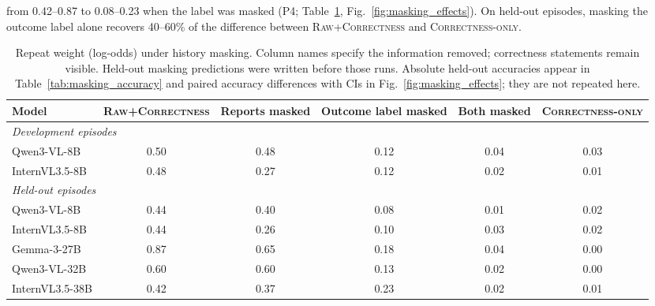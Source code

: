 \documentclass[letterpaper]{article} %
\newcommand{\RawCorrectness}{\textsc{Raw+Correctness}}
\newcommand{\CorrectnessOnly}{\textsc{Correctness-only}}
\begin{document}
from 0.42--0.87 to 0.08--0.23 when the label was masked (P4; Table~\ref{tab:mask}, Fig.~\ref{fig:masking_effects}). On held-out episodes, masking the outcome label alone recovers 40--60\% of the difference between \RawCorrectness{} and \CorrectnessOnly{}.

\begin{table}[!t]\centering\small
  \setlength{\tabcolsep}{5pt}
  \begin{tabular}{l ccccc}
    \toprule
    Model & \RawCorrectness{} & Reports masked & Outcome label masked & Both masked & \CorrectnessOnly{} \\
    \midrule
    \multicolumn{6}{l}{\textit{Development episodes}} \\
    Qwen3-VL-8B & 0.50 & 0.48 & 0.12 & 0.04 & 0.03 \\
    InternVL3.5-8B & 0.48 & 0.27 & 0.12 & 0.02 & 0.01 \\
    \midrule
    \multicolumn{6}{l}{\textit{Held-out episodes}} \\
    Qwen3-VL-8B & 0.44 & 0.40 & 0.08 & 0.01 & 0.02 \\
    InternVL3.5-8B & 0.44 & 0.26 & 0.10 & 0.03 & 0.02 \\
    Gemma-3-27B & 0.87 & 0.65 & 0.18 & 0.04 & 0.00 \\
    Qwen3-VL-32B & 0.60 & 0.60 & 0.13 & 0.02 & 0.00 \\
    InternVL3.5-38B & 0.42 & 0.37 & 0.23 & 0.02 & 0.01 \\
    \bottomrule
  \end{tabular}
  \caption{Repeat weight (log-odds) under history masking. Column names specify the information removed; correctness statements remain visible. Held-out masking predictions were written before those runs. Absolute held-out accuracies appear in Table~\ref{tab:masking_accuracy} and paired accuracy differences with CIs in Fig.~\ref{fig:masking_effects}; they are not repeated here.}
  \label{tab:mask}
\end{table}
\end{document}
